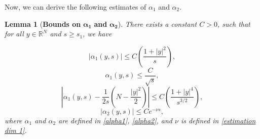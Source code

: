 \documentclass[11pt,a4paper]{article}
\newcommand{\1}{\mathbbm{1}}
\numberwithin{equation}{section}
\newcommand{\numberset}{\mathbb}
\newcommand{\R}{\numberset{R}}
\newtheorem{lemma}{Lemma}[section]
\theoremstyle{remark}
\begin{document}
Now, we can derive the following estimates of $\alpha_1$ and $\alpha_2$.
\begin{lemma}[\textbf{Bounds on }$\mathbf{\alpha_1}$ \textbf{ and }$\mathbf{\alpha_2}$]\label{lemma:estimation alpha_1/2}
There exists a constant $C>0$, such that for all $y\in \R^N$ and $s\geq s_1$, we have

\begin{equation}\label{estimation alpha_1 1}
|\alpha_1(y,s)|\leq C \left(\frac{1+|y|^2}{s}\right),
\end{equation}
\begin{equation}\label{alpha_1 sqrt s}
\alpha_1(y,s)\leq \frac{C}{\sqrt{s}},
\end{equation}
\begin{equation}\label{estimation alpha_1 3}
\left|\alpha_{1}(y,s)-\frac{1}{2s}\left(N-\frac{|y|^2}{2}\right)\right|\leq C\left(\frac{1+|y|^4}{s^{3/2}}\right),
\end{equation}
\begin{equation}\label{estimation alpha_2}
|\alpha_2(y,s)|\leq Ce^{ -\nu s},
\end{equation}
where $\alpha_1$ and $\alpha_2$ are defined in \eqref{alpha1}, \eqref{alpha2}, and $\nu$ is defined in \eqref{estimation dim 1}.
\end{lemma}
\end{document}
